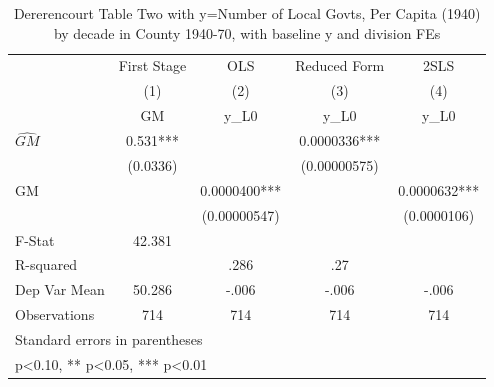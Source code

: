 \begin{table}[htbp]\centering
\def\sym#1{\ifmmode^{#1}\else\(^{#1}\)\fi}
\caption{Dererencourt Table Two with y=Number of Local Govts, Per Capita (1940) by decade in County 1940-70, with baseline y and division FEs}
\begin{tabular}{l*{4}{c}}
\toprule
                    & First Stage   &         OLS   &Reduced Form   &        2SLS   \\
                    &\multicolumn{1}{c}{(1)}&\multicolumn{1}{c}{(2)}&\multicolumn{1}{c}{(3)}&\multicolumn{1}{c}{(4)}\\
                    &\multicolumn{1}{c}{GM}&\multicolumn{1}{c}{y\_L0}&\multicolumn{1}{c}{y\_L0}&\multicolumn{1}{c}{y\_L0}\\
\midrule
$\hat{GM}$          &       0.531***&               &   0.0000336***&               \\
                    &    (0.0336)   &               &(0.00000575)   &               \\
\addlinespace
GM                  &               &   0.0000400***&               &   0.0000632***\\
                    &               &(0.00000547)   &               & (0.0000106)   \\
\midrule
F-Stat              &      42.381   &               &               &               \\
R-squared           &               &        .286   &         .27   &               \\
Dep Var Mean        &      50.286   &       -.006   &       -.006   &       -.006   \\
Observations        &         714   &         714   &         714   &         714   \\
\bottomrule
\multicolumn{5}{l}{\footnotesize Standard errors in parentheses}\\
\multicolumn{5}{l}{\footnotesize * p<0.10, ** p<0.05, *** p<0.01}\\
\end{tabular}
\end{table}
